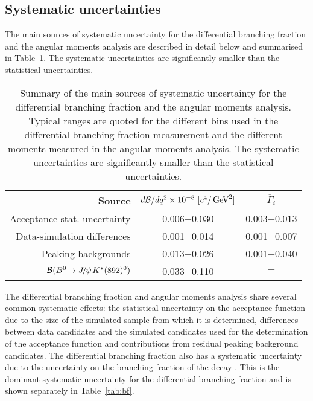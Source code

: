 \subsection{Systematic uncertainties}
\label{sec:kpimm:systematics}

The main sources of systematic uncertainty for the differential branching fraction and the angular moments analysis are described in detail below and summarised in Table~\ref{tab:systematics}. The systematic uncertainties are significantly smaller than the statistical uncertainties.

\begin{table}[!tb]
\caption{Summary of the main sources of systematic uncertainty for the differential branching fraction and the angular moments analysis. Typical ranges are quoted for the different \qsq bins used in the differential branching fraction measurement and the different moments measured in the angular moments analysis.  The systematic uncertainties are significantly smaller than the statistical uncertainties.}
\label{tab:systematics}
\begin{center}
\begin{tabular}{r|cc}
Source & $d{\mathcal{B}}/d{q^2} \times 10^{-8}~[c^{4}/\mathrm{\,Ge\kern -0.1em V}^{2}]$ & $\overline{\Gamma}_{i}$ \\
\hline
Acceptance stat. uncertainty & 0.006$-$0.030 & 0.003$-$0.013 \\
Data-simulation differences & 0.001$-$0.014 & 0.001$-$0.007 \\
Peaking backgrounds & 0.013$-$0.026 & 0.001$-$0.040 \\
\hline
${\mathcal{B}}({{B}^0}\!\rightarrow {\ensuremath{{J\mskip -3mu/\mskip -2mu\psi\mskip 2mu}}}{\ensuremath{K}}^{*}(892)^{0})$ & 0.033$-$0.110 & $-$ \\
\end{tabular}
\end{center}
\end{table} 

The differential branching fraction and angular moments analysis share several common systematic effects: the statistical uncertainty on the acceptance function due to the size of the simulated sample from which it is determined, differences between data candidates and the simulated candidates used for the determination of the acceptance function and contributions from residual peaking background candidates.  The differential branching fraction also has a systematic uncertainty due to the uncertainty on the branching fraction of the decay \BdToJPsiKstP. This is the dominant systematic uncertainty for the differential branching fraction and is shown separately in Table~\ref{tab:bf}. 

